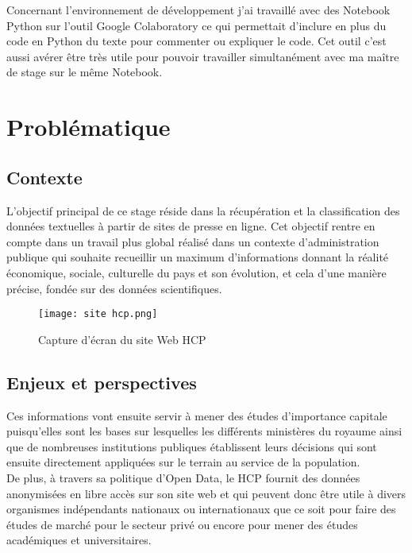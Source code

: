 \documentclass[a4paper,french,12pt]{article}
\begin{document}
Concernant l'environnement de développement j'ai travaillé avec des Notebook Python sur l'outil Google Colaboratory ce qui permettait d'inclure en plus du code en Python du texte pour commenter ou expliquer le code. Cet outil c'est aussi avérer être très utile pour pouvoir travailler simultanément avec ma maître de stage sur le même Notebook.

\section{Problématique}
\label{sec:Problématique}

\subsection{Contexte}

L'objectif principal de ce stage réside dans la récupération et la classification des données textuelles à partir de sites de presse en ligne. Cet objectif rentre en compte dans un travail plus global réalisé dans un contexte d'administration publique qui souhaite recueillir un maximum d'informations donnant la réalité économique, sociale, culturelle du pays et son évolution, et cela d'une manière précise, fondée sur des données scientifiques.

\begin{figure}[!h]      
    \centering
    \texttt{[image: site hcp.png]}
    \caption{Capture d'écran du site Web HCP}
\end{figure}

\subsection{Enjeux et perspectives}

Ces informations vont ensuite servir à mener des études d'importance capitale puisqu'elles sont les bases sur lesquelles les différents ministères du royaume ainsi que de nombreuses institutions publiques établissent leurs décisions qui sont ensuite directement appliquées sur le terrain au service de la population.\\

De plus, à travers sa politique d'Open Data, le HCP fournit des données anonymisées en libre accès sur son site web et qui peuvent donc être utile à divers organismes indépendants nationaux ou internationaux que ce soit pour faire des études de marché pour le secteur privé ou encore pour mener des études académiques et universitaires.\\
\end{document}
